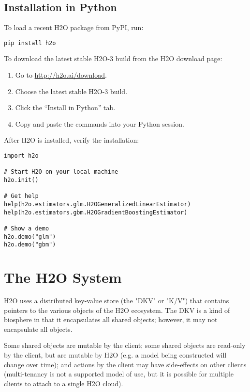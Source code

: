 \subsection{Installation in Python}

To load a recent H2O package from PyPI, run:

\begin{lstlisting}[style=python]
pip install h2o
\end{lstlisting}

To download the
latest stable H2O-3 build from the H2O download page:

\begin{enumerate}
\item Go to {\url{http://h2o.ai/download}}.
\item Choose the latest stable H2O-3 build.
\item Click the ``Install in Python'' tab.
\item Copy and paste the commands into your Python session.
\end{enumerate}


\bigskip
After H2O is installed, verify the installation:

\begin{lstlisting}[style=python]
import h2o

# Start H2O on your local machine
h2o.init()

# Get help
help(h2o.estimators.glm.H2OGeneralizedLinearEstimator)
help(h2o.estimators.gbm.H2OGradientBoostingEstimator)

# Show a demo
h2o.demo("glm")
h2o.demo("gbm")

\end{lstlisting}


\section{The H2O System}

H2O uses a distributed key-value store (the "DKV" or "K/V") that contains pointers to the various objects of the H2O ecosystem. The DKV is a kind of biosphere in that it encapsulates all shared objects; however, it may not encapsulate all objects. 

Some shared objects are mutable by the client; some shared objects are read-only by the client, but are mutable by H2O (e.g. a model being constructed will change over time); and actions by the client may have side-effects on other clients (multi-tenancy is not a supported model of use, but it is possible for multiple clients to attach to a single H2O cloud).

